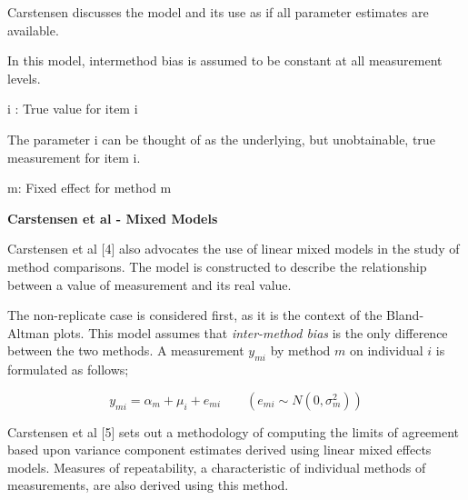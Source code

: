 \documentclass{report}
\begin{document}
	Carstensen discusses the model and its use as if all parameter estimates are available.
	
	In this model, intermethod bias is assumed to be constant at all measurement levels.
	
	i : True value for item i
	
	The parameter i can be thought of as the underlying, but unobtainable, true measurement for item i.
	
	m: Fixed effect for method m
	
	
	\textbf{Carstensen et al - Mixed Models}
	
	Carstensen et al [4] also advocates the use of linear mixed models in
	the study of method comparisons. The model is constructed to
	describe the relationship between a value of measurement and its
	real value. 
	
	The non-replicate case is considered first, as it is
	the context of the Bland-Altman plots. 
	This model assumes that
	\textit{inter-method bias} is the only difference between the two methods.
	A measurement $y_{mi}$ by method $m$ on individual $i$ is
	formulated as follows;
	
	
	\begin{equation}
	y_{mi}  = \alpha_{m} + \mu_{i} + e_{mi} \qquad ( e_{mi} \sim
	N(0,\sigma^{2}_{m}))
	\end{equation}
	
	
	
	
	Carstensen et al [5] sets out a methodology of computing the limits of
	agreement based upon variance component estimates derived using
	linear mixed effects models. 
	Measures of repeatability, a
	characteristic of individual methods of measurements, are also
	derived using this method.
	
\end{document}
